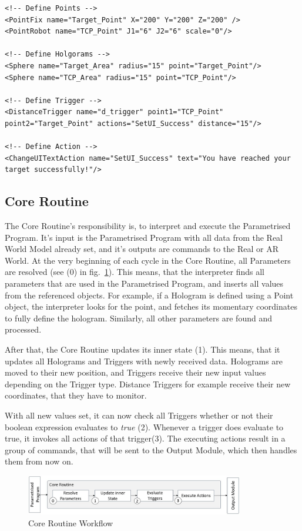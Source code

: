 \begin{lstlisting}
<!-- Define Points -->
<PointFix name="Target_Point" X="200" Y="200" Z="200" />
<PointRobot name="TCP_Point" J1="6" J2="6" scale="0"/>

<!-- Define Holgorams -->
<Sphere name="Target_Area" radius="15" point="Target_Point"/>
<Sphere name="TCP_Area" radius="15" point="TCP_Point"/>

<!-- Define Trigger -->
<DistanceTrigger name="d_trigger" point1="TCP_Point" point2="Target_Point" actions="SetUI_Success" distance="15"/>
	
<!-- Define Action -->
<ChangeUITextAction name="SetUI_Success" text="You have reached your target successfully!"/>
\end{lstlisting}


\subsection{Core Routine}
The Core Routine's responsibility is, to interpret and execute the Parametrised Program. It's input is the Parametrised Program with all data from the Real World Model already set, and it's outputs are commands to the Real or AR World. At the very beginning of each cycle in the Core Routine, all Parameters are resolved (see (0) in fig.~\ref{Fig:CoreRoutine}). This means, that the interpreter finds all parameters that are used in the Parametrised Program, and inserts all values from the referenced objects. For example, if a Hologram is defined using a Point object, the interpreter looks for the point, and fetches its momentary coordinates to fully define the hologram. Similarly, all other parameters are found and processed.

After that, the Core Routine updates its inner state (1). This means, that it updates all Holograms and Triggers with newly received data. Holograms are moved to their new position, and Triggers receive their new input values depending on the Trigger type. Distance Triggers for example receive their new coordinates, that they have to monitor.

With all new values set, it can now check all Triggers whether or not their boolean expression evaluates to \textit{true} (2). Whenever a trigger does evaluate to true, it invokes all actions of that trigger(3). The executing actions result in a group of commands, that will be sent to the Output Module, which then handles them from now on. 

\begin{figure}[!h]
	\centering
	\includegraphics[width=0.85\textwidth]{Figures/CoreRoutine.jpg}
	\caption{Core Routine Workflow}
	\label{Fig:CoreRoutine}
\end{figure}

